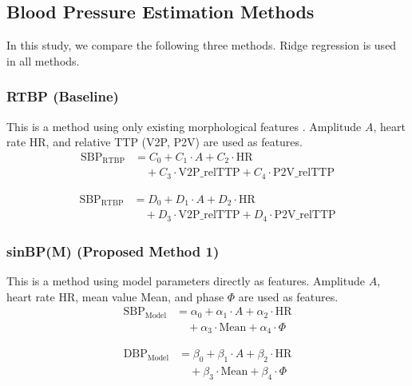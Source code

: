 \documentclass[fleqn,10pt,twocolumn]{AROB}
\begin{document}
\subsection{Blood Pressure Estimation Methods}
In this study, we compare the following three methods. Ridge regression is used in all methods.

\subsubsection{RTBP (Baseline)}
This is a method using only existing morphological features \cite{ref6}. Amplitude $A$, heart rate HR, and relative TTP (V2P, P2V) are used as features.
\begin{equation}
\begin{split}
\text{SBP}_{\text{RTBP}}&= C_0 + C_1 \cdot A + C_2 \cdot \text{HR} \\
&\quad + C_3 \cdot \text{V2P\_relTTP} + C_4 \cdot \text{P2V\_relTTP}
\end{split}
\label{eq:rtbp_sbp}
\end{equation}

\begin{equation}
\begin{split}
\text{SBP}_{\text{RTBP}}&= D_0 + D_1 \cdot A + D_2 \cdot \text{HR} \\
&\quad + D_3 \cdot \text{V2P\_relTTP} + D_4 \cdot \text{P2V\_relTTP}
\end{split}
\label{eq:rtbp_dbp}
\end{equation}

\subsubsection{sinBP(M) (Proposed Method 1)}
This is a method using model parameters directly as features. Amplitude $A$, heart rate HR, mean value Mean, and phase $\Phi$ are used as features.
\begin{equation}
\begin{split}
\text{SBP}_{\text{Model}}&= \alpha_0 + \alpha_1 \cdot A + \alpha_2 \cdot \text{HR} \\
&\quad + \alpha_3 \cdot \text{Mean} + \alpha_4 \cdot \Phi
\end{split}
\label{eq:sinbp_m_sbp}
\end{equation}

\begin{equation}
\begin{split}
\text{DBP}_{\text{Model}} &= \beta_0 + \beta_1 \cdot A + \beta_2 \cdot \text{HR} \\
&\quad + \beta_3 \cdot \text{Mean} + \beta_4 \cdot \Phi
\end{split}
\label{eq:sinbp_m_dbp}
\end{equation}
\end{document}
